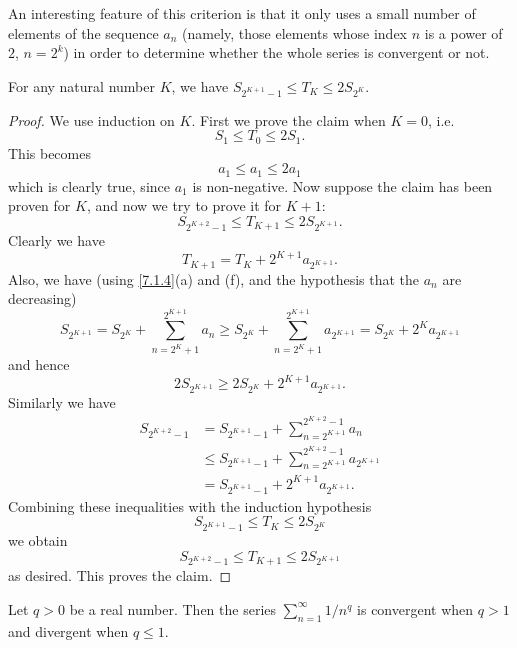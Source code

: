\begin{rmk}\label{7.3.5}
  An interesting feature of this criterion is that it only uses a small number of elements of the sequence \(a_n\)
  (namely, those elements whose index \(n\) is a power of \(2\), \(n = 2^k\))
  in order to determine whether the whole series is convergent or not.
\end{rmk}

\begin{lem}\label{7.3.6}
  For any natural number \(K\), we have \(S_{2^{K + 1} - 1} \leq T_K \leq 2S_{2^K}\).
\end{lem}

\begin{proof}
  We use induction on \(K\).
  First we prove the claim when \(K = 0\), i.e.
  \[
    S_1 \leq T_0 \leq 2S_1.
  \]
  This becomes
  \[
    a_1 \leq a_1 \leq 2a_1
  \]
  which is clearly true, since \(a_1\) is non-negative.
  Now suppose the claim has been proven for \(K\), and now we try to prove it for \(K + 1\):
  \[
    S_{2^{K + 2} - 1} \leq T_{K + 1} \leq 2S_{2^{K + 1}}.
  \]
  Clearly we have
  \[
    T_{K + 1} = T_K + 2^{K + 1} a_{2^{K + 1}}.
  \]
  Also, we have
  (using \cref{7.1.4}(a) and (f), and the hypothesis that the \(a_n\) are decreasing)
  \[
    S_{2^{K + 1}} = S_{2^K} + \sum_{n = 2^K + 1}^{2^{K + 1}} a_n \geq S_{2^K} + \sum_{n = 2^K + 1}^{2^{K + 1}} a_{2^{K + 1}} = S_{2^K} + 2^K a_{2^{K + 1}}
  \]
  and hence
  \[
    2S_{2^{K + 1}} \geq 2S_{2^K} + 2^{K + 1} a_{2^{K + 1}}.
  \]
  Similarly we have
  \begin{align*}
    S_{2^{K + 2} - 1} & = S_{2^{K + 1} - 1} + \sum_{n = 2^{K + 1}}^{2^{K + 2} - 1} a_n              \\
                      & \leq S_{2^{K + 1} - 1} + \sum_{n = 2^{K + 1}}^{2^{K + 2} - 1} a_{2^{K + 1}} \\
                      & = S_{2^{K + 1} - 1} + 2^{K + 1} a_{2^{K + 1}}.
  \end{align*}
  Combining these inequalities with the induction hypothesis
  \[
    S_{2^{K + 1} - 1} \leq T_K \leq 2S_{2^K}
  \]
  we obtain
  \[
    S_{2^{K + 2} - 1} \leq T_{K + 1} \leq 2S_{2^{K + 1}}
  \]
  as desired.
  This proves the claim.
\end{proof}

\begin{cor}\label{7.3.7}
  Let \(q > 0\) be a real number.
  Then the series \(\sum_{n = 1}^\infty 1 / n^q\) is convergent when \(q > 1\) and divergent when \(q \leq 1\).
\end{cor}

